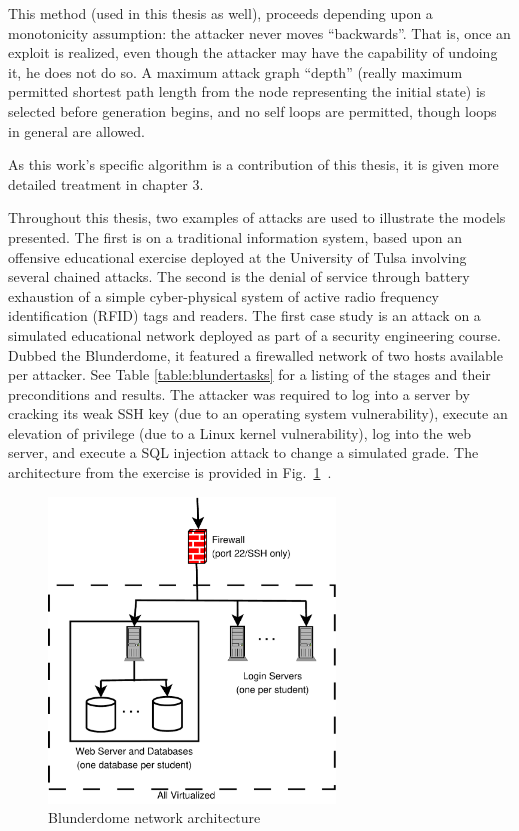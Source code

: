 This method (used in this thesis as well), proceeds
depending upon a monotonicity assumption: the attacker never moves ``backwards''.
That is, once an exploit is realized, even though the attacker may have the capability
of undoing it, he does not do so. A maximum attack graph ``depth'' (really 
maximum permitted shortest path length from the
node representing the initial state) is selected before generation begins, and
no self loops are permitted, though loops in general are allowed.

As this work's specific algorithm is a contribution of this thesis, it is given
more detailed treatment in chapter 3.

Throughout this thesis, two examples of attacks are used to illustrate the models presented.
The first is on a traditional information system, based upon an offensive educational exercise
deployed at the University of Tulsa involving several chained attacks. The second is the 
denial of service through battery exhaustion of a simple
cyber-physical system of active radio frequency identification (RFID) tags and readers.
\label{sec:blunderdome}
The first case study is an attack on a simulated educational network deployed as part of a
security engineering course. Dubbed the Blunderdome, it featured a firewalled network of
two hosts available per attacker. See Table \ref{table:blundertasks} for a listing of the stages and
their preconditions and results. The attacker was required to log into a server by cracking
its weak SSH key (due to an operating system vulnerability), execute an elevation of privilege (due
to a Linux kernel vulnerability), log into the web server, and execute a SQL injection attack to
change a simulated grade. The architecture from the exercise is provided in 
Fig.~\ref{fig:blunderarch}~\cite{louthan2010blunderdome}.

\begin{figure}
\centering
\includegraphics[width=3in]{blunderarch}
\caption{Blunderdome network architecture}
\label{fig:blunderarch}
\end{figure}

